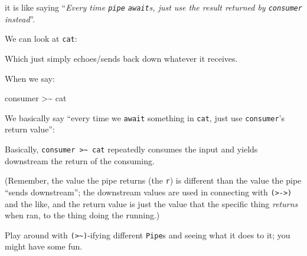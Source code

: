 \documentclass[]{article}
\newenvironment{Shaded}{}{}
\newcommand{\DataTypeTok}[1]{\textcolor[rgb]{0.56,0.13,0.00}{#1}}
\newcommand{\KeywordTok}[1]{\textcolor[rgb]{0.00,0.44,0.13}{\textbf{#1}}}
\newcommand{\NormalTok}[1]{#1}
\newcommand{\OperatorTok}[1]{\textcolor[rgb]{0.40,0.40,0.40}{#1}}
\newcommand{\OtherTok}[1]{\textcolor[rgb]{0.00,0.44,0.13}{#1}}
\begin{document}
it is like saying ``\emph{Every time \texttt{pipe} \texttt{await}s, just use the
result returned by \texttt{consumer} instead}''.

We can look at \texttt{cat}:

\begin{Shaded}
\end{Shaded}

Which just simply echoes/sends back down whatever it receives.

When we say:

\begin{Shaded}
\begin{Highlighting}[]
\NormalTok{consumer }\OperatorTok{>\textasciitilde{}}\NormalTok{ cat}
\end{Highlighting}
\end{Shaded}

We basically say ``every time we \texttt{await} something in \texttt{cat}, just
use \texttt{consumer}'s return value'':

\begin{Shaded}
\end{Shaded}

Basically, \texttt{consumer\ \textgreater{}\textasciitilde{}\ cat} repeatedly
consumes the input and yields downstream the return of the consuming.

(Remember, the value the pipe returns (the \texttt{r}) is different than the
value the pipe ``sends downstream''; the downstream values are used in
connecting with \texttt{(\textgreater{}-\textgreater{})} and the like, and the
return value is just the value that the specific thing \emph{returns} when ran,
to the thing doing the running.)

Play around with \texttt{(\textgreater{}\textasciitilde{})}-ifying different
\texttt{Pipe}s and seeing what it does to it; you might have some fun.
\end{document}
